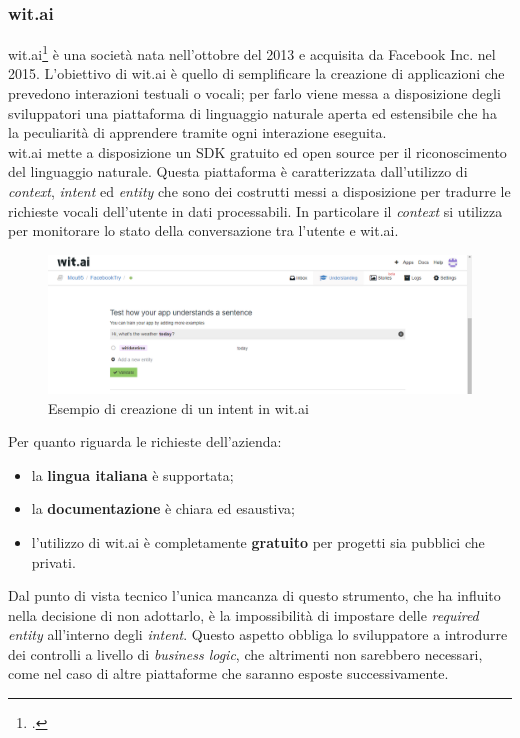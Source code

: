 \subsubsection{wit.ai}
wit.ai\footcite{witai} è una società nata nell'ottobre del 2013 e acquisita da Facebook Inc. nel 2015.
L'obiettivo di wit.ai è quello di semplificare la creazione di applicazioni che prevedono interazioni testuali o vocali; per farlo viene messa a disposizione degli sviluppatori una piattaforma di linguaggio naturale aperta ed estensibile che ha la peculiarità di apprendere tramite ogni interazione eseguita.\\
wit.ai mette a disposizione un \gls{SDK} gratuito ed \gls{open source} per il riconoscimento del linguaggio
naturale. Questa piattaforma è caratterizzata dall'utilizzo di \emph{context}, \emph{intent} ed \emph{entity} che sono
dei costrutti messi a disposizione per tradurre le richieste vocali dell'utente in dati processabili. In particolare il \emph{context} si utilizza per monitorare lo stato della conversazione tra l'utente e wit.ai.

\begin{figure}[h]
	\centering
	\includegraphics[scale=0.4]{../Immagini/witai_example.png}
	\caption{Esempio di creazione di un intent in wit.ai}
\end{figure}

Per quanto riguarda le richieste dell'azienda:
\begin{itemize}
	\item la \textbf{lingua italiana} è supportata;
	\item la \textbf{documentazione} è chiara ed esaustiva;
	\item l'utilizzo di wit.ai è completamente \textbf{gratuito} per progetti sia pubblici che privati.
\end{itemize}

Dal punto di vista tecnico l'unica mancanza di questo strumento, che ha influito nella decisione di non adottarlo, è la impossibilità di impostare delle \emph{required entity} all'interno degli \emph{intent}. Questo aspetto obbliga lo sviluppatore a introdurre dei controlli a livello di \emph{business logic}, che altrimenti non sarebbero necessari, come nel caso di altre piattaforme che saranno esposte successivamente.

